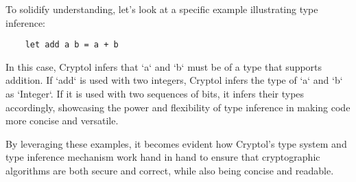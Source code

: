 To solidify understanding, let's look at a specific example illustrating type inference:

\begin{verbatim}
	let add a b = a + b
\end{verbatim}

In this case, Cryptol infers that `a` and `b` must be of a type that supports addition. If `add` is used with two integers, Cryptol infers the type of `a` and `b` as `Integer`. If it is used with two sequences of bits, it infers their types accordingly, showcasing the power and flexibility of type inference in making code more concise and versatile.

By leveraging these examples, it becomes evident how Cryptol's type system and type inference mechanism work hand in hand to ensure that cryptographic algorithms are both secure and correct, while also being concise and readable.

